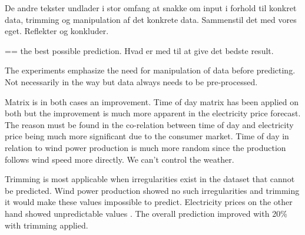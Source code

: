 De andre tekster undlader i stor omfang at snakke om input i forhold til konkret data, trimming og manipulation af det konkrete data. Sammenstil det med vores eget. Reflekter og konkluder.

== the best possible prediction. Hvad er med til at give det bedste result.

The experiments emphasize the need for manipulation of data before predicting. Not necessarily in the way but data always needs to be pre-processed.

Matrix is in both cases an improvement. Time of day matrix has been applied on both but the improvement is much more apparent in the electricity price forecast. The reason must be found in the co-relation between time of day and electricity price being much more significant due to the consumer market. Time of day in relation to wind power production is much more random since the production follows wind speed more directly. We can't control the weather. 

Trimming is most applicable when irregularities exist in the dataset that cannot be predicted. Wind power production showed no such irregularities and trimming it would make these values impossible to predict. Electricity prices on the other hand showed unpredictable values . The overall prediction improved with 20\% with trimming applied. 